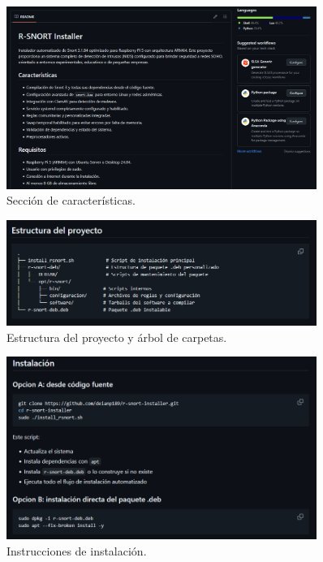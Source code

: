 \documentclass[11pt,a4paper,twoside]{report}
\begin{document}
\begin{figure}[H]
	\centering
	\includegraphics[width=0.9\textwidth]{github/2.png}
	\caption{Sección de características.}
\end{figure}

\begin{figure}[H]
	\centering
	\includegraphics[width=0.9\textwidth]{github/3.png}
	\caption{Estructura del proyecto y árbol de carpetas.}
\end{figure}

\begin{figure}[H]
	\centering
	\includegraphics[width=0.9\textwidth]{github/4.png}
	\caption{Instrucciones de instalación.}
\end{figure}
\end{document}
